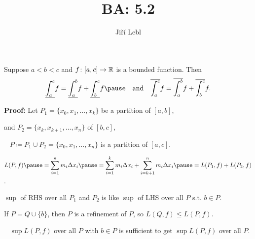 \documentclass[10pt,aspectratio=169]{beamer}
\author{Ji\v{r}\'i Lebl}
\institute[OSU]{%
Departemento pri Matematiko de Oklahoma {\^S}tata Universitato}
\title{BA: 5.2}
\date{}
\begin{document}
\begin{frame}
\titlepage
\end{frame}

\begin{frame}
\begin{lemma}[Additivity]
Suppose $a < b < c$ and $f \colon [a,c] \to {\mathbb{R}}$ is a bounded function.
\pause
Then
\begin{equation*}
\underline{\int_a^c} f
=
\underline{\int_a^b} f
+
\underline{\int_b^c} f
\pause
\quad \text{and} \quad
\overline{\int_a^c} f
=
\overline{\int_a^b} f
+
\overline{\int_b^c} f .
\end{equation*}
\end{lemma}

\pause
\textbf{Proof:}
Let $P_1 = \{ x_0,x_1,\ldots,x_k \}$ be a partition of $[a,b]$,

\pause
and $P_2 = \{ x_k, x_{k+1}, \ldots, x_n \}$ of $[b,c]$,

\pause
\thus~ $P \coloneqq P_1 \cup P_2 = \{ x_0, x_1, \ldots, x_n \}$ is
a partition of $[a,c]$.

\pause
\medskip

\quad $\displaystyle
L(P,f)
\pause
=
\sum_{i=1}^n m_i \Delta x_i
\pause
=
\sum_{i=1}^k m_i \Delta x_i
+
\sum_{i=k+1}^n m_i \Delta x_i
\pause
=
L(P_1,f) + L(P_2,f)$.

\pause
\medskip

$\sup$ of RHS over all $P_1$ and $P_2$ is like
$\sup$ of LHS over all $P$ s.t. $b \in P$.

\pause
\medskip

If $P=Q \cup \{ b \}$, then $P$ is a refinement of $P$, so $L(Q,f) \leq
L(P,f)$.

\pause
\medskip

\thus~ $\sup L(P,f)$ over all $P$ with $b \in P$ is sufficient
to get $\sup L(P,f)$ over all $P$.

\end{frame}
\end{document}
